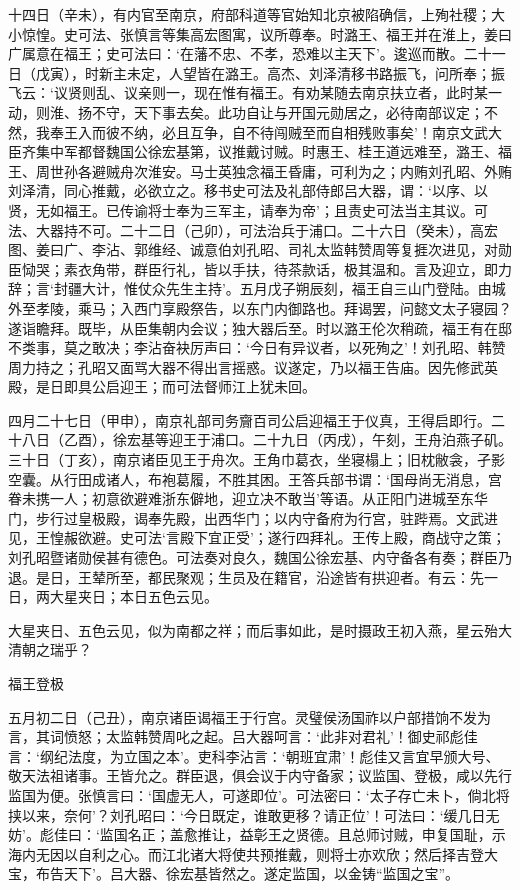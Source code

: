 \documentclass[]{article}
\begin{document}
十四日（辛未），有内官至南京，府部科道等官始知北京被陷确信，上殉社稷；大小惊惶。史可法、张慎言等集高宏图寓，议所尊奉。时潞王、福王并在淮上，姜曰广属意在福王；史可法曰：`在藩不忠、不孝，恐难以主天下'。逡巡而散。二十一日（戊寅），时新主未定，人望皆在潞王。高杰、刘泽清移书路振飞，问所奉；振飞云：`议贤则乱、议亲则一，现在惟有福王。有劝某随去南京扶立者，此时某一动，则淮、扬不守，天下事去矣。此功自让与开国元勋居之，必待南部议定；不然，我奉王入而彼不纳，必且互争，自不待闯贼至而自相残败事矣'！南京文武大臣齐集中军都督魏国公徐宏基第，议推戴讨贼。时惠王、桂王道远难至，潞王、福王、周世孙各避贼舟次淮安。马士英独念福王昏庸，可利为之；内贿刘孔昭、外贿刘泽清，同心推戴，必欲立之。移书史可法及礼部侍郎吕大器，谓：`以序、以贤，无如福王。已传谕将士奉为三军主，请奉为帝'；且责史可法当主其议。可法、大器持不可。二十二日（己卯），可法治兵于浦口。二十六日（癸未），高宏图、姜曰广、李沾、郭维经、诚意伯刘孔昭、司礼太监韩赞周等复捱次进见，对勋臣恸哭；素衣角带，群臣行礼，皆以手扶，待茶款话，极其温和。言及迎立，即力辞；言`封疆大计，惟仗众先生主持'。五月戊子朔辰刻，福王自三山门登陆。由城外至孝陵，乘马；入西门享殿祭告，以东门内御路也。拜谒罢，问懿文太子寝园？遂诣瞻拜。既毕，从臣集朝内会议；独大器后至。时以潞王伦次稍疏，福王有在邸不类事，莫之敢决；李沾奋袂厉声曰：`今日有异议者，以死殉之'！刘孔昭、韩赞周力持之；孔昭又面骂大器不得出言摇惑。议遂定，乃以福王告庙。因先修武英殿，是日即具公启迎王；而可法督师江上犹未回。

四月二十七日（甲申），南京礼部司务齎百司公启迎福王于仪真，王得启即行。二十八日（乙酉），徐宏基等迎王于浦口。二十九日（丙戌），午刻，王舟泊燕子矶。三十日（丁亥），南京诸臣见王于舟次。王角巾葛衣，坐寝榻上；旧枕敝衾，孑影空囊。从行田成诸人，布袍葛履，不胜其困。王答兵部书谓：`国母尚无消息，宫眷未携一人；初意欲避难浙东僻地，迎立决不敢当'等语。从正阳门进城至东华门，步行过皇极殿，谒奉先殿，出西华门；以内守备府为行宫，驻跸焉。文武进见，王惶赧欲避。史可法`言殿下宜正受'；遂行四拜礼。王传上殿，商战守之策；刘孔昭暨诸勋侯甚有德色。可法奏对良久，魏国公徐宏基、内守备各有奏；群臣乃退。是日，王辇所至，都民聚观；生员及在籍官，沿途皆有拱迎者。有云：先一日，两大星夹日；本日五色云见。

大星夹日、五色云见，似为南都之祥；而后事如此，是时摄政王初入燕，星云殆大清朝之瑞乎？

福王登极

五月初二日（己丑），南京诸臣谒福王于行宫。灵璧侯汤国祚以户部措饷不发为言，其词愤怒；太监韩赞周叱之起。吕大器呵言：`此非对君礼'！御史祁彪佳言：`纲纪法度，为立国之本'。吏科李沾言：`朝班宜肃'！彪佳又言宜早颁大号、敬天法祖诸事。王皆允之。群臣退，俱会议于内守备家；议监国、登极，咸以先行监国为便。张慎言曰：`国虚无人，可遂即位'。可法密曰：`太子存亡未卜，倘北将挟以来，奈何'？刘孔昭曰：`今日既定，谁敢更移？请正位'！可法曰：`缓几日无妨'。彪佳曰：`监国名正；盖愈推让，益彰王之贤德。且总师讨贼，申复国耻，示海内无因以自利之心。而江北诸大将使共预推戴，则将士亦欢欣；然后择吉登大宝，布告天下'。吕大器、徐宏基皆然之。遂定监国，以金铸``监国之宝''。
\end{document}
